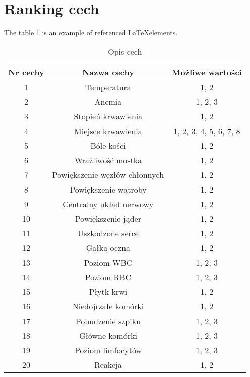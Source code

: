 \section{Ranking cech}
	\blindtext
	The table \ref{table:1} is an example of referenced \LaTeX elements.
	\begin{table}[h!]
		\centering
		\begin{tabular}{|| c | c | c ||} 
			 \hline
			 Nr cechy & Nazwa cechy & Możliwe wartości \\ [0.5ex] 
			 \hline\hline
			 1 & Temperatura & 1, 2 \\ 
			 2 & Anemia & 1, 2, 3 \\
			 3 & Stopień krwawienia & 1, 2 \\
			 4 & Miejsce krwawienia & 1, 2, 3, 4, 5, 6, 7, 8 \\
			 5 & Bóle kości & 1, 2 \\
			 6 & Wrażliwość mostka & 1, 2 \\
			 7 & Powiększenie węzłów chłonnych & 1, 2 \\
			 8 & Powiększenie wątroby & 1, 2 \\
			 9 & Centralny układ nerwowy & 1, 2 \\
			 10 & Powiększenie jąder & 1, 2 \\
			 11 & Uszkodzone serce & 1, 2 \\
			 12 & Gałka oczna & 1, 2 \\
			 13 & Poziom WBC & 1, 2, 3 \\
			 14 & Poziom RBC & 1, 2, 3 \\
			 15 & Płytk krwi & 1, 2 \\
			 16 & Niedojrzałe komórki & 1, 2 \\
			 17 & Pobudzenie szpiku & 1, 2, 3 \\
			 18 & Główne komórki & 1, 2, 3 \\
			 19 & Poziom limfocytów & 1, 2, 3 \\
			 20 & Reakcja & 1, 2 \\ [1ex] 
			 \hline
		\end{tabular}
		\caption{Opis cech}
		\label{table:1}
	\end{table}

